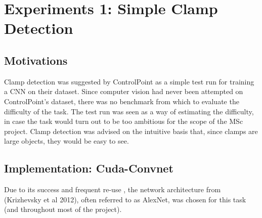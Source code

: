 \documentclass[a4paper,11pt]{article}
\begin{document}
%
%
%

\clearpage

\section{Experiments 1: Simple Clamp Detection}

\subsection{Motivations}

Clamp detection was suggested by ControlPoint as a simple test run for training a CNN on their dataset. Since computer vision had never been attempted on ControlPoint's dataset, there was no benchmark from which to evaluate the difficulty of the task. The test run was seen as a way of estimating the difficulty, in case the task would turn out to be too ambitious for the scope of the MSc project. Clamp detection was advised on the intuitive basis that, since clamps are large objects, they would be easy to see. 

\subsection{Implementation: Cuda-Convnet}

Due to its success and frequent re-use \cite{rectifier} \cite{goodfellow_street_view} \cite{decaf} \cite{fergus_tutorial} \cite{colah} \cite{zeiler_fergus} \cite{transfer-learning} \cite{caffe-website}, the network architecture from (Krizhevsky et al 2012), often referred to as AlexNet, was chosen for this task (and throughout most of the project).
\end{document}

